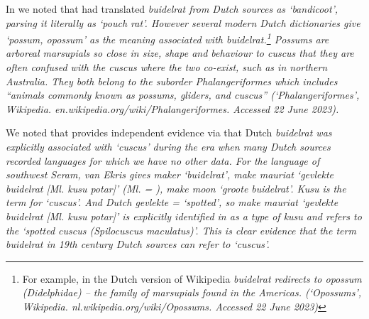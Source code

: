 In  we noted that \citet{Blust1982,Blust2012b}
had translated \it{buidelrat} from Dutch sources as ‘bandicoot’,
parsing it literally as ‘pouch rat’.
However several modern Dutch dictionaries give  ‘possum,
opossum’ as the meaning associated with \it{buidelrat}.\footnote{
		For example, in the Dutch version of Wikipedia \it{buidelrat} redirects to
		\it{opossum} (Didelphidae) -- the family of marsupials found
		in the Americas. (‘Opossums’, Wikipedia. nl.wikipedia.org/wiki/Opossums.
		Accessed 22 June 2023)}
Possums are arboreal marsupials so close
in size, shape and behaviour to cuscus that they are often confused with
the cuscus where the two co-exist,
such as in northern Australia.
They both belong to the suborder Phalangeriformes which includes
“animals commonly known as possums,
gliders, and cuscus” (`Phalangeriformes', Wikipedia. en.wikipedia.org/wiki/Phalangeriformes.
Accessed 22 June 2023).

We noted that \citet[304--305]{vanEkris1864} provides independent
evidence via  that Dutch \it{buidelrat} was explicitly associated
with ‘cuscus’ during the era when many Dutch sources recorded
languages for which we have no other data.
For the  language of southwest Seram,
van Ekris gives \it{maker} ‘buidelrat’,
\it{make mauriat} ‘gevlekte buidelrat [Ml.
kusu potar]’ (Ml. = ), \it{make moon} ‘groote buidelrat’.
\it{Kusu} is the   term for ‘cuscus’.
And Dutch \it{gevlekte} = ‘spotted’,
so \it{make mauriat} ‘gevlekte buidelrat [Ml.
kusu potar]’ is explicitly identified in  as a type of \it{kusu}
and refers to the ‘spotted cuscus (\it{Spilocuscus maculatus})’.
This is clear evidence that the term \it{buidelrat} in 19th century
Dutch sources can refer to ‘cuscus’.

